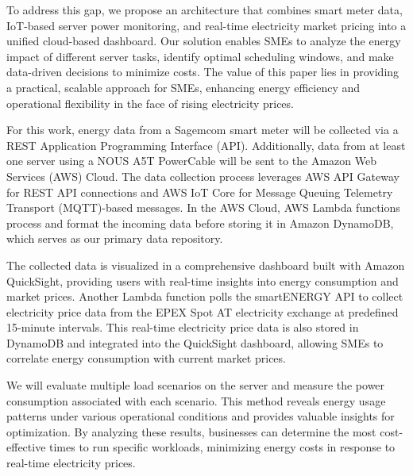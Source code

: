 To address this gap, we propose an architecture that combines smart meter data, IoT-based server power monitoring, and real-time electricity market pricing into a unified cloud-based dashboard. Our solution enables SMEs to analyze the energy impact of different server tasks, identify optimal scheduling windows, and make data-driven decisions to minimize costs. The value of this paper lies in providing a practical, scalable approach for SMEs, enhancing energy efficiency and operational flexibility in the face of rising electricity prices.

For this work, energy data from a Sagemcom smart meter will be collected via a REST Application Programming Interface (API). Additionally, data from at least one server using a NOUS A5T PowerCable will be sent to the Amazon Web Services (AWS) Cloud. The data collection process leverages AWS API Gateway for REST API connections and AWS IoT Core for Message Queuing Telemetry Transport (MQTT)-based messages. In the AWS Cloud, AWS Lambda functions process and format the incoming data before storing it in Amazon DynamoDB, which serves as our primary data repository.

The collected data is visualized in a comprehensive dashboard built with Amazon QuickSight, providing users with real-time insights into energy consumption and market prices. Another Lambda function polls the smartENERGY API to collect electricity price data from the EPEX Spot AT electricity exchange at predefined 15-minute intervals. This real-time electricity price data is also stored in DynamoDB and integrated into the QuickSight dashboard, allowing SMEs to correlate energy consumption with current market prices.

We will evaluate multiple load scenarios on the server and measure the power consumption associated with each scenario. This method reveals energy usage patterns under various operational conditions and provides valuable insights for optimization. By analyzing these results, businesses can determine the most cost-effective times to run specific workloads, minimizing energy costs in response to real-time electricity prices. 
